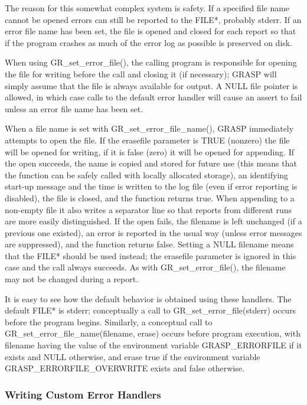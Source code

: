 The reason for this somewhat complex system is safety.  If a specified
file name cannot be opened errors can still be reported to the FILE*,
probably stderr.  If an error file name has been set, the file is
opened and closed for each report so that if the program crashes as
much of the error log as possible is preserved on disk.

When using GR\_set\_error\_file(), the calling program is responsible
for opening the file for writing before the call and closing it (if
necessary); GRASP will simply assume that the file is always available
for output.  A NULL file pointer is allowed, in which case calls to the
default error handler will cause an assert to fail unless an error file
name has been set.

When a file name is set with GR\_set\_error\_file\_name(), GRASP
immediately attempts to open the file.  If the erasefile parameter is
TRUE (nonzero) the file will be opened for writing, if it is false
(zero) it will be opened for appending.  If the open succeeds, the name
is copied and stored for future use (this means that the function can
be safely called with locally allocated storage), an identifying
start-up message and the time is written to the log file (even if error
reporting is disabled), the file is closed, and the function returns
true.  When appending to a non-empty file it also writes a separator
line so that reports from different runs are more easily
distinguished.  If the open fails, the filename is left unchanged (if a
previous one existed), an error is reported in the usual way (unless
error messages are suppressed), and the function returns false.
Setting a NULL filename means that the FILE* should be used instead;
the erasefile parameter is ignored in this case and the call always
succeeds.  As with GR\_set\_error\_file(), the filename may not be
changed during a report.

It is easy to see how the default behavior is obtained using these
handlers.  The default FILE* is stderr; conceptually a call to
GR\_set\_error\_file(stderr) occurs before the program begins.
Similarly, a conceptual call to GR\_set\_error\_file\_name(filename,
erase) occurs before program execution, with filename having the value
of the environment variable GRASP\_ERRORFILE if it exists and NULL
otherwise, and erase true if the environment variable
GRASP\_ERRORFILE\_OVERWRITE exists and false otherwise.

\subsubsection{Writing Custom Error Handlers}


